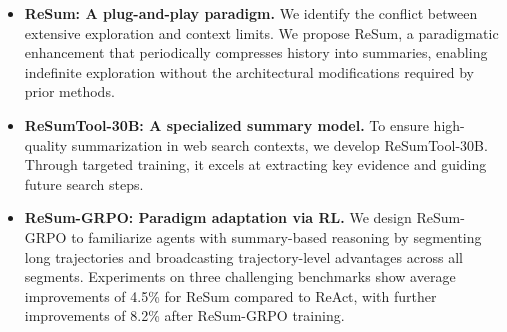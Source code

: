 \begin{itemize}
\item \textbf{ReSum: A plug-and-play paradigm.} We identify the conflict between extensive exploration and context limits. We propose ReSum, a paradigmatic enhancement that periodically compresses history into summaries, enabling indefinite exploration without the architectural modifications required by prior methods.

\item \textbf{ReSumTool-30B: A specialized summary model.} To ensure high-quality summarization in web search contexts, we develop ReSumTool-30B. Through targeted training, it excels at extracting key evidence and guiding future search steps.

\item \textbf{ReSum-GRPO: Paradigm adaptation via RL.} We design ReSum-GRPO to familiarize agents with summary-based reasoning by segmenting long trajectories and broadcasting trajectory-level advantages across all segments. Experiments on three challenging benchmarks show average improvements of 4.5\% for ReSum compared to ReAct, with further improvements of 8.2\% after ReSum-GRPO training.
\end{itemize}

